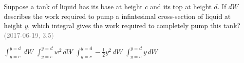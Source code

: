 \documentclass[12pt]{exam}
\newcommand{\questionDate}[1]{\textcolor{gray}{(#1)}}
\newcommand{\<}{\langle}
\renewcommand{\>}{\rangle}
\begin{document}
\begin{questions}
  \question
  Suppose a tank of liquid has its base at height \(c\) and its
  top at height \(d\).
  If \(dW\) describes the work required to pump a infintesimal
  cross-section of liquid at height \(y\), which integral gives the work
  required to completely pump this tank?
  \questionDate{2017-06-19, 3.5}
  \begin{choices}
    \CorrectChoice
      \(\int_{y=c}^{y=d}\,dW\)
    \choice
      \(\int_{y=c}^{y=d}w^2\,dW\)
    \choice
      \(\int_{y=c}^{y=d}-\frac{1}{2}y^2\,dW\)
    \choice
      \(\int_{y=c}^{y=d}y\,dW\)
  \end{choices}
%
%
%
%
%
%
%
%

\end{questions}
\end{document}

